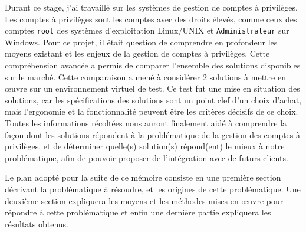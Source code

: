 Durant ce stage, j'ai travaillé sur les systèmes de gestion de comptes à privilèges.
Les comptes à privilèges sont les comptes avec des droits élevés, comme ceux des comptes \texttt{root} des systèmes d'exploitation Linux/UNIX et \texttt{Administrateur} sur Windows.
Pour ce projet, il était question de comprendre en profondeur les moyens existant et les enjeux de la gestion de comptes à privilèges.
Cette compréhension avancée a permis de comparer l'ensemble des solutions disponibles sur le marché.
Cette comparaison a mené à considérer 2 solutions à mettre en œuvre sur un environnement virtuel de test.
Ce test fut une mise en situation des solutions, car les spécifications des solutions sont un point clef d'un choix d'achat, mais l'ergonomie et la fonctionnalité peuvent être les critères décisifs de ce choix.
Toutes les informations récoltées nous auront finalement aidé à comprendre la façon dont les solutions répondent à la problématique de la gestion des comptes à privilèges, et de déterminer quelle(s) solution(s) répond(ent) le mieux à notre problématique, afin de pouvoir proposer de l'intégration avec de futurs clients.

Le plan adopté pour la suite de ce mémoire consiste en une première section décrivant la problématique à résoudre, et les origines de cette problématique. Une deuxième section expliquera les moyens et les méthodes mises en œuvre pour répondre à cette problématique et enfin une dernière partie expliquera les résultats obtenus.